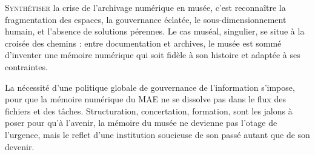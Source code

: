 


\bigskip
\bigskip
\bigskip

\lettrine{S}{ynthétiser} la crise de l’archivage numérique en musée, c’est reconnaître la fragmentation des espaces, la gouvernance éclatée, le sous-dimensionnement humain, et l’absence de solutions pérennes. Le cas muséal, singulier, se situe à la croisée des chemins : entre documentation et archives, le musée est sommé d’inventer une mémoire numérique qui soit fidèle à son histoire et adaptée à ses contraintes.

La nécessité d’une politique globale de gouvernance de l’information s’impose, pour que la mémoire numérique du MAE ne se dissolve pas dans le flux des fichiers et des tâches. Structuration, concertation, formation, sont les jalons à poser pour qu’à l’avenir, la mémoire du musée ne devienne pas l’otage de l’urgence, mais le reflet d’une institution soucieuse de son passé autant que de son devenir.